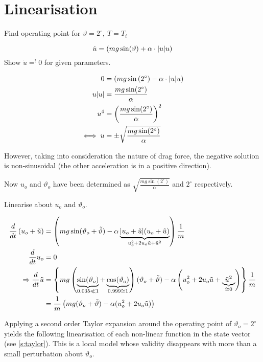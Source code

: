 \section{Linearisation}
Find operating point for $\vartheta = 2^\circ,\:T=T_i$

\begin{equation*}
	\dot{u} = \left(mg\sin(\vartheta)+\alpha\cdot\lvert u\rvert u\right)
\end{equation*}
Show $\dot{u}=^!0$ for given parameters.

\begin{align*}
0&=\left(mg\sin\left(2^\circ\right) -\alpha \cdot\lvert u\rvert u\right)\\
u\lvert u\rvert&=\frac{mg\sin(2^\circ)}{\alpha}\\
u^4&=\left(\frac{mg\sin(2^\circ)}{\alpha}\right)^2\\
\iff{} u&=\pm \sqrt{\frac{mg\sin(2^\circ)}{\alpha}}
\end{align*}

However, taking into consideration the nature of drag force, the negative solution is non-sinusoidal (the other acceleration is in a positive direction).

Now $u_o$ and $\vartheta_o$ have been determined as $\sqrt{\frac{mg\sin(2^\circ)}{\alpha}}$ and $2^\circ$ respectively.
	
Linearise about $u_o$ and $\vartheta_o$.

\begin{captioneq}[ht]
\centering
\begin{align*}
\frac{d}{dt}\left(u_o+\tilde{u}\right)&=\left(mg\sin(\vartheta_o+\tilde\vartheta)-\alpha\underbrace{\lvert u_o+\tilde{u}\rvert(u_o+\tilde{u})}_{u_o^2+2u_o\tilde{u}+\tilde{u}^2}\right)\frac{1}{m}\\
\frac{d}{dt}u_o&=0\\
\Rightarrow\frac{d}{dt}\tilde{u}&=\left\{
	mg\left(
		\underbrace{\sin(\vartheta_o)}_{0.035\ll 1}
		+\underbrace{\cos(\vartheta_o)}_{0.999\cong 1}
		\right)	
	(\vartheta_o+\tilde\vartheta)
	-\alpha\left(u_o^2+2u_o\tilde{u}+\underbrace{\tilde{u}^2}_{\cong 0}\right)
\right\}\frac{1}{m}\\
&=\frac{1}{m}\left(mg(\vartheta_o+\tilde{\vartheta}) - \alpha(u_o^2+2u_o\tilde{u})\right)
\end{align*}
\end{captioneq}

Applying a second order Taylor expansion around the operating point of $\vartheta_o = 2^\circ$ yields the following linearisation of each non-linear function in the state vector (see \cref{s:taylor}). This is a local model whose validity disappears with more than a small perturbation about $\vartheta_o$.

